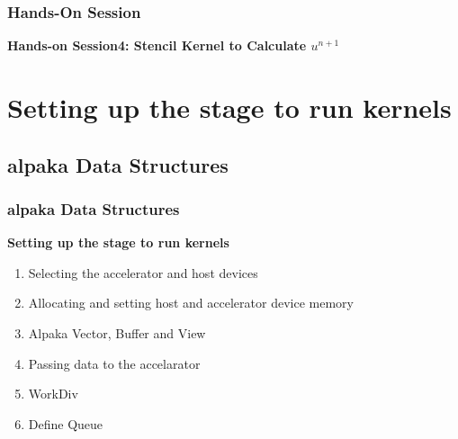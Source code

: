 \documentclass[9pt]{beamer}
\begin{document}




\begin{frame}
\frametitle{Hands-On Session}
\begin{center}
      \Huge \textbf{Hands-on Session4: Stencil Kernel to Calculate $u^{n+1}$}
  \end{center}
\end{frame}

\section{Setting up the stage to run kernels}
\subsection{alpaka Data Structures}
\begin{frame}
\frametitle{alpaka Data Structures}
\begin{center}
      \Huge \textbf{Setting up the stage to run kernels}
  \end{center}
\begin{enumerate}
 \item Selecting the accelerator and host devices
 \item Allocating and setting host and accelerator device memory
 \item Alpaka Vector, Buffer and View
 \item Passing data to the accelarator
 \item WorkDiv
 \item Define Queue
\end{enumerate}
    \end{frame}
\end{document}
